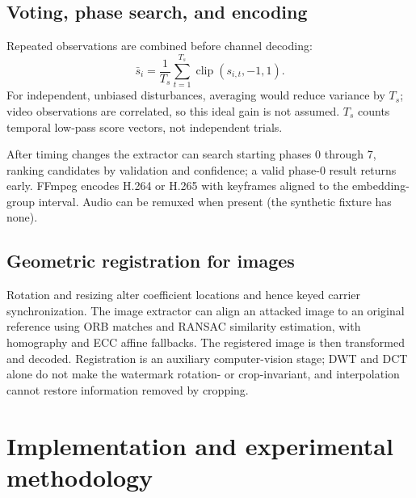 \documentclass[11pt,a4paper]{article}
\begin{document}
\subsection{Voting, phase search, and encoding}
Repeated observations are combined before channel decoding:
\begin{equation}
\bar{s}_i=\frac{1}{T_s}\sum_{t=1}^{T_s}\operatorname{clip}(s_{i,t},-1,1).
\end{equation}
For independent, unbiased disturbances, averaging would reduce variance by
$T_s$; video observations are correlated, so this ideal gain is not assumed.
$T_s$ counts temporal low-pass score vectors, not independent trials.

After timing changes the extractor can search starting phases 0 through 7, ranking
candidates by validation and confidence; a valid phase-0 result returns early.
FFmpeg encodes H.264 or H.265 with keyframes aligned to the embedding-group
interval. Audio can be remuxed when present (the synthetic fixture has none).

\subsection{Geometric registration for images}
Rotation and resizing alter coefficient locations and hence keyed carrier
synchronization. The image extractor can align an attacked image to an original
reference using ORB matches and RANSAC similarity estimation, with homography and
ECC affine fallbacks. The registered image is then transformed and decoded.
Registration is an auxiliary computer-vision stage; DWT and DCT alone do not make
the watermark rotation- or crop-invariant, and interpolation cannot restore
information removed by cropping.

\section{Implementation and experimental methodology}
\end{document}
